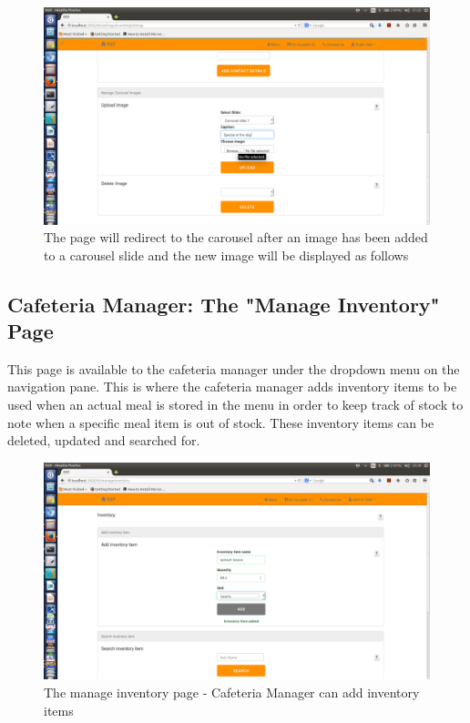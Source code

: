\documentclass[a4paper,12pt]{report}
\begin{document}
\begin{figure}[H]
  \centering
    \includegraphics[width=1.0\textwidth]{screenshots/coverImage.png}
    \caption{The page will redirect to the carousel after an image has been added to a carousel slide and the new image will be displayed as follows} 
\end{figure}

\subsection{Cafeteria Manager: The "Manage Inventory" Page}
This page is available to the cafeteria manager under the dropdown menu on the navigation pane. This is where the cafeteria manager adds inventory items to be used when an actual meal is stored in the menu in order to keep track of stock to note when a specific meal item is out of stock. These inventory items can be deleted, updated and searched for. 

\begin{figure}[H]
  \centering
    \includegraphics[width=1.0\textwidth]{screenshots/addInv.png}
    \caption{The manage inventory page - Cafeteria Manager can add inventory items}
\end{figure}
\end{document}
